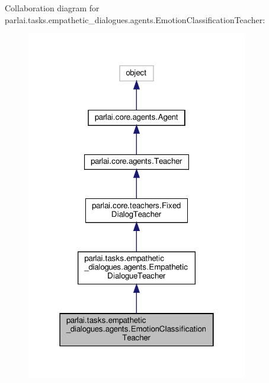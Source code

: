 Collaboration diagram for parlai.\+tasks.\+empathetic\+\_\+dialogues.\+agents.\+Emotion\+Classification\+Teacher\+:
\nopagebreak
\begin{figure}[H]
\begin{center}
\leavevmode
\includegraphics[width=274pt]{classparlai_1_1tasks_1_1empathetic__dialogues_1_1agents_1_1EmotionClassificationTeacher__coll__graph}
\end{center}
\end{figure}
